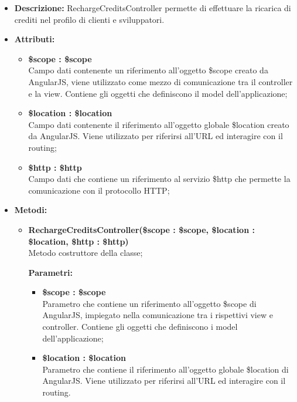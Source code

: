 \begin{itemize}
	\item \textbf{Descrizione:} RechargeCreditsController permette di effettuare la ricarica di crediti nel profilo di clienti e sviluppatori.
	\item \textbf{Attributi:}
	\begin{itemize}
		
		\item \textbf{\$scope : \$scope}\\
		Campo dati contenente un riferimento all'oggetto \$scope creato da AngularJS, viene utilizzato come mezzo di comunicazione tra il controller e la view. Contiene gli oggetti che definiscono il model dell'applicazione;
		
		\item \textbf{\$location : \$location }\\
		Campo dati contenente il riferimento all'oggetto globale \$location creato da AngularJS. Viene utilizzato per riferirsi all'URL ed interagire con il routing;
		
		\item \textbf{\$http : \$http }\\
		Campo dati che contiene un riferimento al servizio \$http che permette la comunicazione con il protocollo HTTP;
		
	\end{itemize}
	\item \textbf{Metodi:}
	\begin{itemize}
		
		\item \textbf{RechargeCreditsController(\$scope : \$scope, \$location : \$location, \$http : \$http)}\\
		Metodo costruttore della classe;
		\begin{description}
			\item[\textbf{Parametri:}]
		\end{description}
		\begin{itemize}
			\item \textbf{\$scope : \$scope}\\
			Parametro che contiene un riferimento all'oggetto \$scope di AngularJS, impiegato nella comunicazione tra i rispettivi view e controller. Contiene gli oggetti che definiscono i model dell'applicazione;
			
			\item \textbf{\$location : \$location}\\
			Parametro che contiene il riferimento all'oggetto globale \$location di AngularJS. Viene utilizzato per riferirsi all'URL ed interagire con il routing.
			

\end{itemize}
\end{itemize}
\end{itemize}
